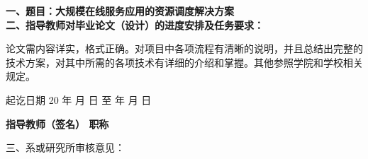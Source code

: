 
{
    \bfseries
    \noindent 一、题目：大规模在线服务应用的资源调度解决方案\\
    \noindent 二、指导教师对毕业论文（设计）的进度安排及任务要求：\\
}

论文需内容详实，格式正确。对项目中各项流程有清晰的说明，并且总结出完整的技术方案，对其中所需的各项技术有详细的介绍和掌握。其他参照学院和学校相关规定。

{
    \vskip 50mm

    \noindent 起讫日期 20 \quad 年 \quad  月 \quad  日 \quad 至  \quad  年 \quad  月  \quad 日
    \begin{flushright}
        \bfseries {}
            指导教师（签名） \underline{} 职称 \underline{}
    \end{flushright}

    \noindent 三、系或研究所审核意见：\\

    \mbox{} \vfill
    \signature{负责人（签名）}
}
